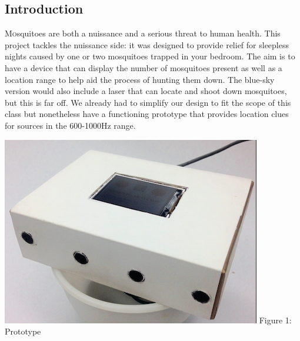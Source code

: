 \documentclass[twoside]{article}
\begin{document}
\begin{multicols}{2} %

\section{Introduction}

\lettrine[nindent=0em,lines=3]{M}osquitoes are both a nuissance and a serious threat to human health. This project tackles the nuissance side: it was designed to provide relief for sleepless nights caused by one or two mosquitoes trapped in your bedroom. The aim is to have a device that can display the number of mosquitoes present as well as a location range to help aid the process of hunting them down. The blue-sky version would also include a laser that can locate and shoot down mosquitoes, but this is far off. We already had to simplify our design to fit the scope of this class but nonetheless have a functioning prototype that provides location clues for sources in the 600-1000Hz range. 

\begin{center}
\includegraphics[scale=0.40]{diagView.png}
\newline Figure 1:  Prototype
\end{center}



\end{multicols}
\end{document}
